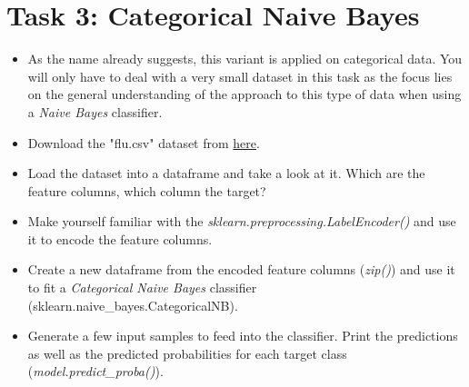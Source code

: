 \documentclass{article}
\begin{document}
\section*{Task 3: Categorical Naive Bayes}
\begin{itemize}
    \item As the name already suggests, this variant is applied on categorical data. You will only have to deal with a very small dataset in this task as the focus lies on the general understanding of the approach to this type of data when using a \emph{Naive Bayes} classifier.
    \item Download the "flu.csv" dataset from \href{https://github.com/DataScienceLabFHSWF/MachineLearningCourse/tree/main/data/04}{here}.
    \item Load the dataset into a dataframe and take a look at it. Which are the feature columns, which column the target?
    \item Make yourself familiar with the \emph{sklearn.preprocessing.LabelEncoder()} and use it to encode the feature columns.
    \item Create a new dataframe from the encoded feature columns (\emph{zip()}) and use it to fit a \emph{Categorical Naive Bayes} classifier (sklearn.naive\_bayes.CategoricalNB).
    \item Generate a few input samples to feed into the classifier. Print the predictions as well as the predicted probabilities for each target class (\emph{model.predict\_proba()}).
\end{itemize}

%
%
\end{document}
